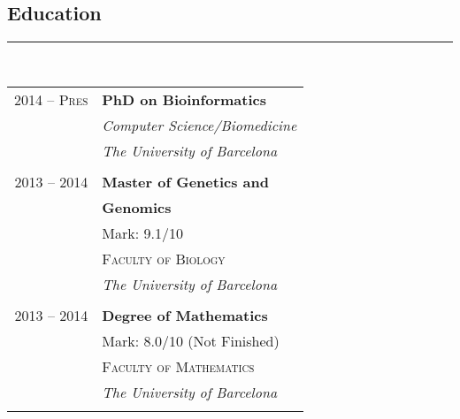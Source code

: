 \documentclass[10pt]{article} %
\begin{document}
\hfill
\begin{minipage}[t]{0.44\textwidth} %
\vspace{0pt} %


\begin{spacing}{0.0}
\section{Education}
\end{spacing}
\rule{8cm}{0.4pt}
\\

\begin{tabular}{rl} %


\textsc{2014 -- Pres}	 & \textbf{PhD on Bioinformatics}\\
& \textit{Computer Science/Biomedicine}\\
& \textit{The University of Barcelona}\\ \\


2013 -- 2014 & \textbf{Master of Genetics and}\\
& \textbf{Genomics}\\ 
& \small Mark: 9.1/10 \\
& \textsc{Faculty of Biology} \\ 
& \textit{The University of Barcelona}\\
&\\
	 

2013 -- 2014 & \textbf{Degree of Mathematics} \\ 
& \small Mark: 8.0/10 (Not Finished) \\
& \textsc{Faculty of Mathematics} \\ 
& \textit{The University of Barcelona}\\
&\\
	 

\end{tabular}
\end{minipage}
\end{document}
